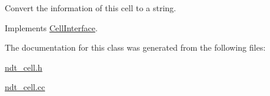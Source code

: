 Convert the information of this cell to a string. 



Implements \hyperlink{classCellInterface_aaf0e64422724ac733741783a4323a4c2}{Cell\+Interface}.



The documentation for this class was generated from the following files\+:\begin{DoxyCompactItemize}
\item 
\hyperlink{ndt__cell_8h}{ndt\+\_\+cell.\+h}\item 
\hyperlink{ndt__cell_8cc}{ndt\+\_\+cell.\+cc}\end{DoxyCompactItemize}

